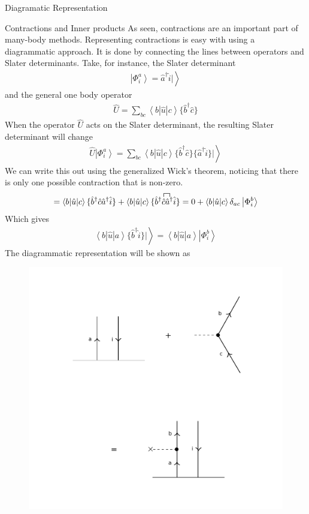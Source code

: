 \documentclass[twoside,english]{uiofysmaster}
\begin{document}
\begin{chapter}{Diagramatic Representation}
	\begin{section}{Contractions and Inner products}
		As seen, contractions are an important part of many-body methods. Representing contractions is easy with using a diagrammatic approach. It is done by connecting the lines between operators and Slater determinants. Take, for instance, the Slater determinant \cite{Audun,ShavittAndBartlett}
		\begin{align}
			\left| \Phi_i^a \right> = \hat a^\dagger \hat i | \left. \right> 
		\end{align}
		and the general one body operator 
		\begin{align}
			\hat U = \sum_{bc} \left< b | \hat u | c \right> \{ \hat b^\dagger \hat c \}
		\end{align}
		When the operator $\hat U$ acts on the Slater determinant, the resulting Slater determinant will change 
		\begin{align}
			\hat U \left| \Phi_i^a \right> = \sum_{bc} \left< b | \hat u | c \right> \{ \hat b^\dagger \hat c \} \{ \hat a^\dagger \hat i \} | \left. \right>
		\end{align}
		We can write this out using the generalized Wick's theorem, noticing that there is only one possible contraction that is non-zero. 
		\begin{align}
			= \left< b | \hat u | c \right> \{ \hat b^\dagger \hat c \hat a^\dagger \hat i \} + \left< b | \hat u | c \right> \{ \hat b^\dagger \contraction{}{\hat c}{}{\hat a^\dagger}
			\hat c \hat a^\dagger \hat i \} = 0 + \left< b | \hat u | c \right> \delta_{ac} \left| \Phi_i^b \right>
		\end{align}
		Which gives
		\begin{align}
			\left< b | \hat u | a \right> \{ \hat b^\dagger \hat i \} | \left. \right> = \left< b | \hat u | a \right> \left| \Phi_i^b \right>
		\end{align}
		The diagrammatic representation will be shown as 
		\newpage
		\begin{figure}[H]
			\includegraphics[width=\textwidth]{Figures/Contraction.pdf}

\end{figure}
\end{section}
\end{chapter}
\end{document}
